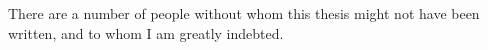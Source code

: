 \documentclass[
11pt, 
oneside,
english,
onehalfspacing,
onehalfspacing,
parskip,
headsepline,
]{MastersDoctoralThesis}
\begin{document}
\begin{acknowledgements}
There are a number of people without whom this thesis might not have been written,
and to whom I am greatly indebted.\\






\end{acknowledgements}
\end{document}
